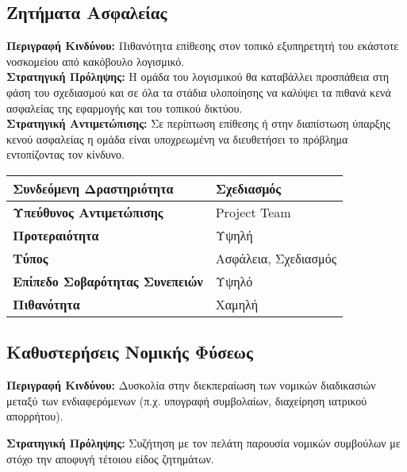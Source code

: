 \documentclass{article}
\newcommand\T{\rule{0pt}{2.6ex}}       %
\newcommand\B{\rule[-1.2ex]{0pt}{0pt}}
\begin{document}
\subsection{Ζητήματα Ασφαλείας}

\textbf{Περιγραφή Κινδύνου:} Πιθανότητα επίθεσης στον τοπικό εξυπηρετητή του εκάστοτε νοσκομείου από κακόβουλο λογισμικό.\\

\textbf{Στρατηγική Πρόληψης:} Η ομάδα του λογισμικού θα καταβάλλει προσπάθεια στη φάση του σχεδιασμού και σε όλα τα στάδια υλοποίησης να καλύψει τα πιθανά κενά ασφαλείας της εφαρμογής και του τοπικού δικτύου.\\

\textbf{Στρατηγική Αντιμετώπισης:} Σε περίπτωση επίθεσης ή στην διαπίστωση ύπαρξης κενού ασφαλείας η ομάδα είναι υποχρεωμένη να διευθετήσει το πρόβλημα εντοπίζοντας τον κίνδυνο.\\
 
 \begin{center}
     \begin{tabular}{|l|l|}
     \hline
      \textbf{Συνδεόμενη Δραστηριότητα}   & Σχεδιασμός \T\B \\ 
      \hline
      \textbf{Υπεύθυνος Αντιμετώπισης} & Project Team \T\B \\
      \hline
      \textbf{Προτεραιότητα} & Υψηλή \T\B \\
      \hline
      \textbf{Τύπος} & Ασφάλεια, Σχεδιασμός \T\B \\
      \hline
      \textbf{Επίπεδο Σοβαρότητας Συνεπειών} & Υψηλό \T\B \\
      \hline
      \textbf{Πιθανότητα} & Χαμηλή \T\B \\
      \hline
     \end{tabular}
 \end{center}

\subsection{Καθυστερήσεις Νομικής Φύσεως}

\textbf{Περιγραφή Κινδύνου:} Δυσκολία στην διεκπεραίωση των νομικών διαδικασιών μεταξύ των ενδιαφερόμενων (π.χ. υπογραφή συμβολαίων, διαχείρηση ιατρικού απορρήτου).\\ 
\newpage

\textbf{Στρατηγική Πρόληψης:} Συζήτηση με τον πελάτη παρουσία νομικών συμβούλων
με στόχο την αποφυγή τέτοιου είδος ζητημάτων.\\
\end{document}
